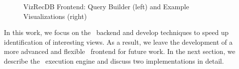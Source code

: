 \begin{figure}[htb]
\vspace{-10pt}
\centerline{
\hbox{}
\hbox{}}
\caption{VizRecDB Frontend: Query Builder (left) and Example Visualizations
(right)}
\label{fig:frontend1}
\vspace{-10pt}
\end{figure} 

In this work, we focus on the \VizRecDB\ backend and develop techniques to
speed up identification of interesting views. As a result, we leave the
development of a more advanced and flexible \VizRecDB\ frontend for future work. 
In the next section, we describe the \VizRecDB\ execution engine and discuss
two implementations in detail.
